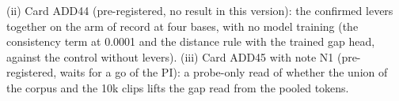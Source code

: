 (ii) Card ADD44 (pre-registered, no result in this version): the confirmed levers together on the arm of record at four bases, with no model training (the consistency term at 0.0001 and the distance rule with the trained gap head, against the control without levers). (iii) Card ADD45 with note N1 (pre-registered, waits for a go of the PI): a probe-only read of whether the union of the corpus and the 10k clips lifts the gap read from the pooled tokens.

